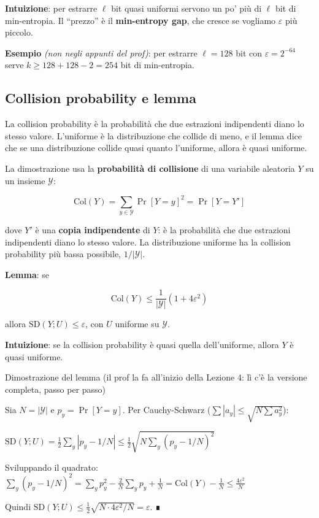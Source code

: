 \textbf{Intuizione}: per estrarre \(\ell\) bit quasi uniformi servono un po' più di \(\ell\) bit di min-entropia. Il ``prezzo'' è il \textbf{min-entropy gap}, che cresce se vogliamo \(\varepsilon\) più piccolo.

\begin{esempio}

\textbf{Esempio} \emph{(non negli appunti del prof)}: per estrarre \(\ell = 128\) bit con \(\varepsilon = 2^{-64}\) serve \(k \ge 128 + 128 - 2 = 254\) bit di min-entropia.

\end{esempio}

\subsection{Collision probability e lemma}

\begin{inbreve}

La collision probability è la probabilità che due estrazioni indipendenti diano lo stesso valore. L'uniforme è la distribuzione che collide di meno, e il lemma dice che se una distribuzione collide quasi quanto l'uniforme, allora è quasi uniforme.

\end{inbreve}

La dimostrazione usa la \textbf{probabilità di collisione} di una variabile aleatoria \(Y\) su un insieme \(\mathcal{Y}\):

\[
\text{Col}(Y) = \sum_{y \in \mathcal{Y}} \Pr[Y = y]^2 = \Pr[Y = Y']
\]

dove \(Y'\) è una \textbf{copia indipendente} di \(Y\): è la probabilità che due estrazioni indipendenti diano lo stesso valore. La distribuzione uniforme ha la collision probability più bassa possibile, \(1/|\mathcal{Y}|\).

\textbf{Lemma}: se

\[
\text{Col}(Y) \le \frac{1}{|\mathcal{Y}|}(1 + 4\varepsilon^2)
\]

allora \(\text{SD}(Y; U) \le \varepsilon\), con \(U\) uniforme su \(\mathcal{Y}\).

\textbf{Intuizione}: se la collision probability è quasi quella dell'uniforme, allora \(Y\) è quasi uniforme.

\begin{approfondimento}{Dimostrazione del lemma (il prof la fa all'inizio della Lezione 4: lì
c'è la versione completa, passo per passo)}

Sia \(N = |\mathcal{Y}|\) e \(p_y = \Pr[Y = y]\). Per Cauchy-Schwarz (\(\sum |a_y| \le \sqrt{N \sum a_y^2}\)):

\(\text{SD}(Y; U) = \frac{1}{2}\sum_y |p_y - 1/N| \le \frac{1}{2}\sqrt{N \sum_y (p_y - 1/N)^2}\)

Sviluppando il quadrato: \(\sum_y (p_y - 1/N)^2 = \sum_y p_y^2 - \frac{2}{N}\sum_y p_y + \frac{1}{N} = \text{Col}(Y) - \frac{1}{N} \le \frac{4\varepsilon^2}{N}\)

Quindi \(\text{SD}(Y; U) \le \frac{1}{2}\sqrt{N \cdot 4\varepsilon^2 / N} = \varepsilon\). ∎

\end{approfondimento}

